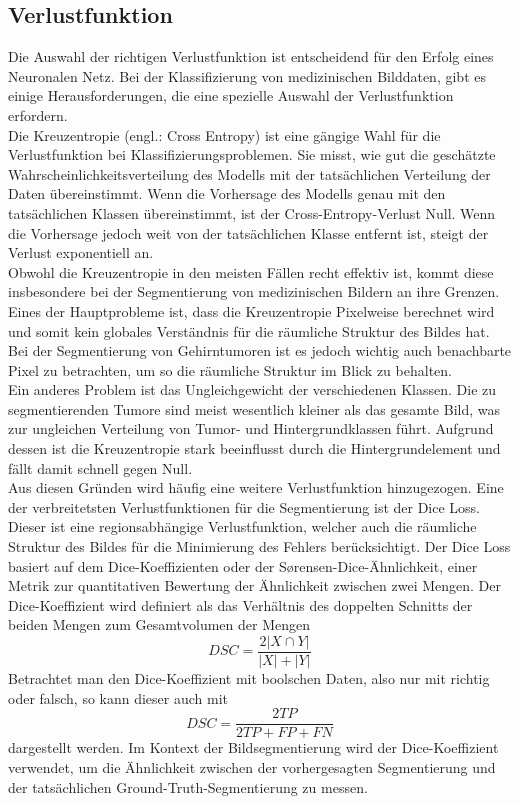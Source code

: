 \subsection{Verlustfunktion}
Die Auswahl der richtigen Verlustfunktion ist entscheidend für den Erfolg eines Neuronalen Netz. Bei der Klassifizierung von medizinischen Bilddaten, gibt es einige Herausforderungen, die eine spezielle Auswahl der Verlustfunktion erfordern.\\
Die Kreuzentropie (engl.: Cross Entropy) ist eine gängige Wahl für die Verlustfunktion bei Klassifizierungsproblemen. Sie misst, wie gut die geschätzte Wahrscheinlichkeitsverteilung des Modells mit der tatsächlichen Verteilung der Daten übereinstimmt. Wenn die Vorhersage des Modells genau mit den tatsächlichen Klassen übereinstimmt, ist der Cross-Entropy-Verlust Null. Wenn die Vorhersage jedoch weit von der tatsächlichen Klasse entfernt ist, steigt der Verlust exponentiell an. \cite[vgl.][]{Murphy2012}\\
Obwohl die Kreuzentropie in den meisten Fällen recht effektiv ist, kommt diese insbesondere bei der Segmentierung von medizinischen Bildern an ihre Grenzen. Eines der Hauptprobleme ist, dass die Kreuzentropie Pixelweise berechnet wird und somit kein globales Verständnis für die räumliche Struktur des Bildes hat. Bei der Segmentierung von Gehirntumoren ist es jedoch wichtig auch benachbarte Pixel zu betrachten, um so die räumliche Struktur im Blick zu behalten. \\
Ein anderes Problem ist das Ungleichgewicht der verschiedenen Klassen. Die zu segmentierenden Tumore sind meist wesentlich kleiner als das gesamte Bild, was zur ungleichen Verteilung von Tumor- und Hintergrundklassen führt. Aufgrund dessen ist die Kreuzentropie stark beeinflusst durch die Hintergrundelement und fällt damit schnell gegen Null. \cite[][]{Yeung2021}\\
Aus diesen Gründen wird häufig eine weitere Verlustfunktion hinzugezogen. Eine der verbreitetsten Verlustfunktionen für die Segmentierung ist der Dice Loss. Dieser ist eine regionsabhängige Verlustfunktion, welcher auch die räumliche Struktur des Bildes für die Minimierung des Fehlers berücksichtigt. Der Dice Loss basiert auf dem Dice-Koeffizienten oder der Sørensen-Dice-Ähnlichkeit, einer Metrik zur quantitativen Bewertung der Ähnlichkeit zwischen zwei Mengen. Der Dice-Koeffizient wird definiert als das Verhältnis des doppelten Schnitts der beiden Mengen zum Gesamtvolumen der Mengen
\begin{equation}
	DSC={\frac {2|X\cap Y|}{|X|+|Y|}}
\end{equation}
Betrachtet man den Dice-Koeffizient mit boolschen Daten, also nur mit richtig oder falsch, so kann dieser auch mit 
\begin{equation}
	DSC={\frac {2TP}{2TP+FP+FN}}
\end{equation}
dargestellt werden. Im Kontext der Bildsegmentierung wird der Dice-Koeffizient verwendet, um die Ähnlichkeit zwischen der vorhergesagten Segmentierung und der tatsächlichen Ground-Truth-Segmentierung zu messen. \cite[vgl.][]{Sudre2017}



